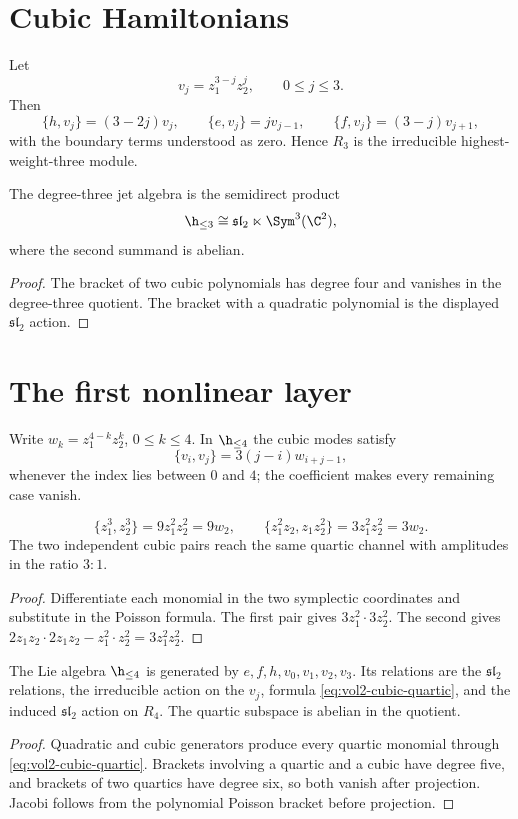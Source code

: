 \section{Cubic Hamiltonians}
Let
\[
 v_j=z_1^{3-j}z_2^j,
 \qquad 0\le j\le3.
\]
Then
\[
 \{h,v_j\}=(3-2j)v_j,
 \qquad
 \{e,v_j\}=jv_{j-1},
 \qquad
 \{f,v_j\}=(3-j)v_{j+1},
\]
with the boundary terms understood as zero.  Hence $R_3$ is the irreducible highest-weight-three module.

\begin{proposition}
The degree-three jet algebra is the semidirect product
\[
 \h_{\le3}\cong\mathfrak{sl}_2\ltimes\Sym^3(\C^2),
\]
where the second summand is abelian.
\end{proposition}
\begin{proof}
The bracket of two cubic polynomials has degree four and vanishes in the degree-three quotient.  The bracket with a quadratic polynomial is the displayed $\mathfrak{sl}_2$ action.
\end{proof}

\section{The first nonlinear layer}
Write $w_k=z_1^{4-k}z_2^k$, $0\le k\le4$.  In $\h_{\le4}$ the cubic modes satisfy
\begin{equation}\label{eq:vol2-cubic-quartic}
 \{v_i,v_j\}=3(j-i)w_{i+j-1},
\end{equation}
whenever the index lies between $0$ and $4$; the coefficient makes every remaining case vanish.

\begin{calculation}
\[
 \{z_1^3,z_2^3\}=9z_1^2z_2^2=9w_2,
 \qquad
 \{z_1^2z_2,z_1z_2^2\}=3z_1^2z_2^2=3w_2.
\]
The two independent cubic pairs reach the same quartic channel with amplitudes in the ratio $3:1$.
\end{calculation}
\begin{proof}
Differentiate each monomial in the two symplectic coordinates and substitute in the Poisson formula.  The first pair gives $3z_1^2\cdot3z_2^2$.  The second gives $2z_1z_2\cdot2z_1z_2-z_1^2\cdot z_2^2=3z_1^2z_2^2$.
\end{proof}

\begin{theorem}
The Lie algebra $\h_{\le4}$ is generated by $e,f,h,v_0,v_1,v_2,v_3$.  Its relations are the $\mathfrak{sl}_2$ relations, the irreducible action on the $v_j$, formula \eqref{eq:vol2-cubic-quartic}, and the induced $\mathfrak{sl}_2$ action on $R_4$.  The quartic subspace is abelian in the quotient.
\end{theorem}
\begin{proof}
Quadratic and cubic generators produce every quartic monomial through \eqref{eq:vol2-cubic-quartic}.  Brackets involving a quartic and a cubic have degree five, and brackets of two quartics have degree six, so both vanish after projection.  Jacobi follows from the polynomial Poisson bracket before projection.
\end{proof}

